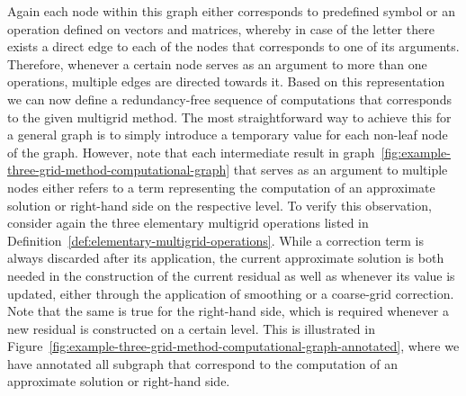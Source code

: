 Again each node within this graph either corresponds to predefined symbol or an operation defined on vectors and matrices, whereby in case of the letter there exists a direct edge to each of the nodes that corresponds to one of its arguments.  
Therefore, whenever a certain node serves as an argument to more than one operations, multiple edges are directed towards it.
Based on this representation we can now define a redundancy-free sequence of computations that corresponds to the given multigrid method.
The most straightforward way to achieve this for a general graph is to simply introduce a temporary value for each non-leaf node of the graph.
However, note that each intermediate result in graph~\ref{fig:example-three-grid-method-computational-graph} that serves as an argument to multiple nodes either refers to a term representing the computation of an approximate solution or right-hand side on the respective level.
To verify this observation, consider again the three elementary multigrid operations listed in Definition~\ref{def:elementary-multigrid-operations}.
While a correction term is always discarded after its application, the current approximate solution is both needed in the construction of the current residual as well as whenever its value is updated, either through the application of smoothing or a coarse-grid correction.
Note that the same is true for the right-hand side, which is required whenever a new residual is constructed on a certain level.
This is illustrated in Figure~\ref{fig:example-three-grid-method-computational-graph-annotated}, where we have annotated all subgraph that correspond to the computation of an approximate solution or right-hand side.


 
